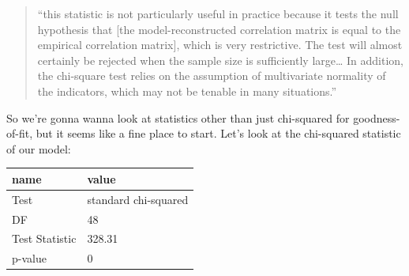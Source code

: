 \documentclass[
  letterpaper,
  DIV=11,
  numbers=noendperiod]{scrreprt}
\newenvironment{Shaded}{\begin{snugshade}}{\end{snugshade}}
\newcommand{\AttributeTok}[1]{\textcolor[rgb]{0.40,0.45,0.13}{#1}}
\newcommand{\DecValTok}[1]{\textcolor[rgb]{0.68,0.00,0.00}{#1}}
\newcommand{\DocumentationTok}[1]{\textcolor[rgb]{0.37,0.37,0.37}{\textit{#1}}}
\newcommand{\FunctionTok}[1]{\textcolor[rgb]{0.28,0.35,0.67}{#1}}
\newcommand{\NormalTok}[1]{\textcolor[rgb]{0.00,0.23,0.31}{#1}}
\newcommand{\OtherTok}[1]{\textcolor[rgb]{0.00,0.23,0.31}{#1}}
\newcommand{\SpecialCharTok}[1]{\textcolor[rgb]{0.37,0.37,0.37}{#1}}
\newcommand{\StringTok}[1]{\textcolor[rgb]{0.13,0.47,0.30}{#1}}
\begin{document}
\begin{quote}
``this statistic is not particularly useful in practice because it tests
the null hypothesis that {[}the model-reconstructed correlation matrix
is equal to the empirical correlation matrix{]}, which is very
restrictive. The test will almost certainly be rejected when the sample
size is sufficiently large\ldots{} In addition, the chi-square test
relies on the assumption of multivariate normality of the indicators,
which may not be tenable in many situations.''
\end{quote}

So we're gonna wanna look at statistics other than just chi-squared for
goodness-of-fit, but it seems like a fine place to start. Let's look at
the chi-squared statistic of our model:

\begin{Shaded}
\end{Shaded}

\begin{longtable}[]{@{}ll@{}}
\toprule()
name & value \\
\midrule()
\endhead
Test & standard chi-squared \\
DF & 48 \\
Test Statistic & 328.31 \\
p-value & 0 \\
\bottomrule()
\end{longtable}
\end{document}
